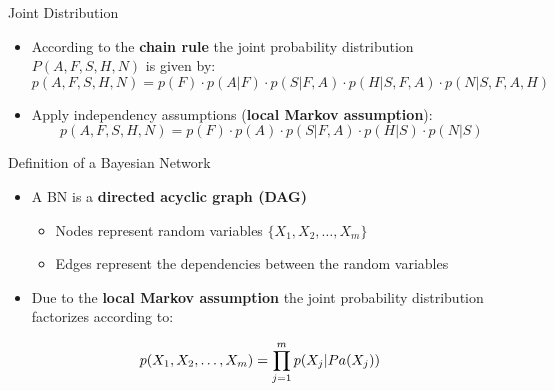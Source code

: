 \begin{frame}{Joint Distribution}{}
	\begin{itemize}
		\item According to the \textbf{chain rule} the joint probability distribution $P(A, F, S, H, N)$ is given by:
		\begin{equation*}
			p(A, F, S, H, N) = p(F) \cdot p(A \vert F) \cdot p(S \vert F, A) \cdot p(H \vert S, F, A) \cdot p(N \vert S, F, A, H)
		\end{equation*}
		\item Apply independency assumptions (\textbf{local Markov assumption}):
		\begin{equation*}
			p(A, F, S, H, N) = p(F) \cdot p(A) \cdot p(S \vert F, A) \cdot p(H \vert S) \cdot p(N \vert S)
		\end{equation*}
	\end{itemize}

	\vspace*{-3mm}
	\begin{boxBlueNoFrame}
	\end{boxBlueNoFrame}
\end{frame}


\begin{frame}{Definition of a Bayesian Network}{}
	\begin{itemize}
		\item A BN is a \textbf{directed acyclic graph (DAG)}
		\begin{itemize}
			\item Nodes represent random variables $\{X_1, X_2, \dots, X_m\}$
			\item Edges represent the dependencies between the random variables
		\end{itemize}
		\item Due to the \textbf{local Markov assumption} the joint probability distribution factorizes according to:
	\end{itemize}

	\begin{boxBlue}
		\begin{equation}
			\large
			p(X_1, X_2, \dots, X_m) = \prod_{j=1}^m p(X_j \vert Pa(X_j))
		\end{equation}
	\end{boxBlue}
\end{frame}


